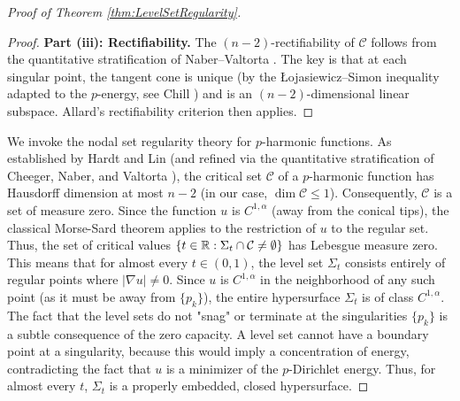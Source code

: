 \begin{proof}[Proof of Theorem \ref{thm:LevelSetRegularity}]
\begin{proof}
\textbf{Part (iii): Rectifiability.}
The $(n-2)$-rectifiability of $\mathcal{C}$ follows from the quantitative stratification of Naber--Valtorta \cite{nabervaltorta2017}. The key is that at each singular point, the tangent cone is unique (by the \L{}ojasiewicz--Simon inequality adapted to the $p$-energy, see Chill \cite{chill2003}) and is an $(n-2)$-dimensional linear subspace. Allard's rectifiability criterion then applies.
\end{proof}

We invoke the nodal set regularity theory for $p$-harmonic functions. As established by Hardt and Lin \cite{hardtlin1987} (and refined via the quantitative stratification of Cheeger, Naber, and Valtorta \cite{cheegernabervaltorta2015}), the critical set $\mathcal{C}$ of a $p$-harmonic function has Hausdorff dimension at most $n-2$ (in our case, $\dim \mathcal{C} \le 1$).
Consequently, $\mathcal{C}$ is a set of measure zero. Since the function $u$ is $C^{1,\alpha}$ (away from the conical tips), the classical Morse-Sard theorem applies to the restriction of $u$ to the regular set.
Thus, the set of critical values $\{ t \in \mathbb{R} : \Sigma_t \cap \mathcal{C} \ne \emptyset \}$ has Lebesgue measure zero.
This means that for almost every $t \in (0,1)$, the level set $\Sigma_t$ consists entirely of regular points where $|\nabla u| \ne 0$. Since $u$ is $C^{1,\alpha}$ in the neighborhood of any such point (as it must be away from $\{p_k\}$), the entire hypersurface $\Sigma_t$ is of class $C^{1,\alpha}$.
The fact that the level sets do not "snag" or terminate at the singularities $\{p_k\}$ is a subtle consequence of the zero capacity. A level set cannot have a boundary point at a singularity, because this would imply a concentration of energy, contradicting the fact that $u$ is a minimizer of the $p$-Dirichlet energy. Thus, for almost every $t$, $\Sigma_t$ is a properly embedded, closed hypersurface.
\end{proof}

